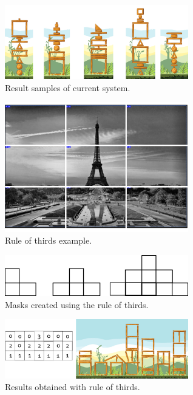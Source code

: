 \documentclass[conference]{IEEEtran}
\begin{document}
     \begin{figure}[htbp]
        \centerline{\includegraphics[width=80mm]{Images/result_example.png}}
        \caption{Result samples of current system.}
        \label{results_old}
    \end{figure}
    
    \begin{figure}[htbp]
        \centerline{\includegraphics[width=80mm]{Images/ruleofthirds_example.png}}
        \caption{Rule of thirds example.}
        \label{rule_of_thirds}
    \end{figure}
    
    \begin{figure}[htbp]
        \centerline{\includegraphics[width=80mm]{Images/mask_distribution.png}}
        \caption{Masks created using the rule of thirds.}
        \label{rule_of_thirds_masks}
    \end{figure}
    
    
    \begin{figure}[htbp]
        \centerline{\includegraphics[width=80mm]{Images/result_example_thirds.png}}
        \caption{Results obtained with rule of thirds.}
        \label{rule_of_thirds_result}
    \end{figure}
    
\end{document}
